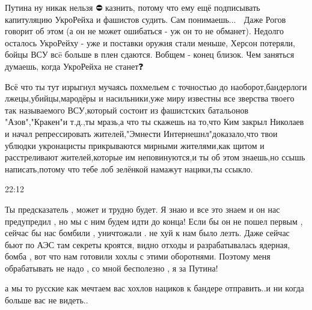Путина ну никак нельзя ⛔ казнить, потому что ему ещё подписывать капитуляцию УкроРейха и фашистов судить.
Сам понимаешь... 🤔
Даже Рогов говорит об этом (а он не может ошибаться - уж он то не обманет).
Недолго осталось УкроРейху - уже и поставки оружия стали меньше, Херсон потеряли, бойцы ВСУ всë больше в плен сдаются. Вобщем - конец близок.
Чем заняться думаешь, когда УкроРейха не станет❓


Всё что ты тут изрыгнул мучаясь похмельем с точностью до наоборот,бандерлоги
лжецы,убийцы,мародёры и насильники,уже миру известны все зверства твоего так
называемого ВСУ,который состоит из фашистских батальонов "Азов","Кракен"и
т.д.,ты мразь,а что ты скажешь на то,что Ким закрыл Николаев и начал
репрессировать жителей,"Эмнести Интернешнл"доказало,что твои ублюдки
укронацисты прикрываются мирными жителями,как щитом и расстреливают
жителей,которые им неповинуются,и ты об этом знаешь,но ссышь написать,потому
что тебе лоб зелёнкой намажут нацики,ты ссыкло.

22:12

Ты предсказатель , может и трудно будет. Я знаю и все это знаем и он нас
предупредил , но мы с ним будем идти до конца! Если бы он не пошел первым ,
сейчас бы нас бомбили , уничтожали . не хуй к нам было лезть. Даже сейчас бьют
по АЭС там секреты кроятся, видно отходы и разрабатывалась ядерная, бомба , вот
что нам готовили хохлы с этими оборотнями. Поэтому меня обрабатывать не надо ,
со мной бесполезно , я за Путина!


а мы то русские как мечтаем вас хохлов нациков к бандере отправить..и ни когда
больше вас не видеть..







